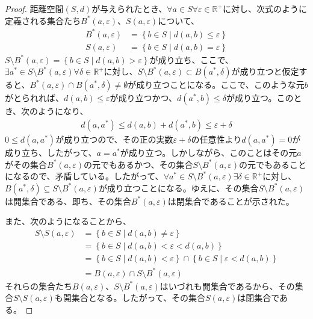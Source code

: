 \documentclass[dvipdfmx]{jsarticle}
\begin{document}
\begin{proof}
距離空間$(S,d)$が与えられたとき、$\forall a \in S\forall\varepsilon \in \mathbb{R}^{+}$に対し、次式のように定義される集合たち$B^{*}(a,\varepsilon)$、$S(a,\varepsilon)$について、
\begin{align*}
B^{*}(a,\varepsilon) &= \left\{ b \in S \middle| d(a,b) \leq \varepsilon \right\}\\
S(a,\varepsilon) &= \left\{ b \in S \middle| d(a,b) = \varepsilon \right\}
\end{align*}
$S \setminus B^{*}(a,\varepsilon) = \left\{ b \in S \middle| d(a,b) > \varepsilon \right\}$が成り立ち、ここで、$\exists a^{*} \in S \setminus B^{*}(a,\varepsilon)\forall\delta \in \mathbb{R}^{+}$に対し、$S \setminus B^{*}(a,\varepsilon) \subset B\left( a^{*},\delta \right)$が成り立つと仮定すると、$B^{*}(a,\varepsilon) \cap B\left( a^{*},\delta \right) \neq \emptyset$が成り立つことになる。ここで、このような元$b$がとられれば、$d(a,b) \leq \varepsilon$が成り立つかつ、$d\left( a^{*},b \right) \leq \delta$が成り立つ。このとき、次のようになり、
\begin{align*}
d\left( a,a^{*} \right) \leq d(a,b) + d\left( a^{*},b \right) \leq \varepsilon + \delta
\end{align*}
$0 \leq d\left( a,a^{*} \right)$が成り立つので、その正の実数$\varepsilon + \delta$の任意性より$d\left( a,a^{*} \right) = 0$が成り立ち、したがって、$a = a^{*}$が成り立つ。しかしながら、このことはその元$a$がその集合$B^{*}(a,\varepsilon)$の元でもあるかつ、その集合$S \setminus B^{*}(a,\varepsilon)$の元でもあることになるので、矛盾している。したがって、$\forall a^{*} \in S \setminus B^{*}(a,\varepsilon)\exists\delta \in \mathbb{R}^{+}$に対し、$B\left( a^{*},\delta \right) \subseteq S \setminus B^{*}(a,\varepsilon)$が成り立つことになる。ゆえに、その集合$S \setminus B^{*}(a,\varepsilon)$は開集合である、即ち、その集合$B^{*}(a,\varepsilon)$は閉集合であることが示された。\par
また、次のようになることから、
\begin{align*}
S \setminus S(a,\varepsilon) &= \left\{ b \in S \middle| d(a,b) \neq \varepsilon \right\}\\
&= \left\{ b \in S \middle| d(a,b) < \varepsilon < d(a,b) \right\}\\
&= \left\{ b \in S \middle| d(a,b) < \varepsilon \right\} \cap \left\{ b \in S \middle| \varepsilon < d(a,b) \right\}\\
&= B(a,\varepsilon) \cap S \setminus B^{*}(a,\varepsilon)
\end{align*}
それらの集合たち$B(a,\varepsilon)$、$S \setminus B^{*}(a,\varepsilon)$はいづれも開集合であるから、その集合$S \setminus S(a,\varepsilon)$も開集合となる。したがって、その集合$S(a,\varepsilon)$は閉集合である。
\end{proof}
\end{document}
